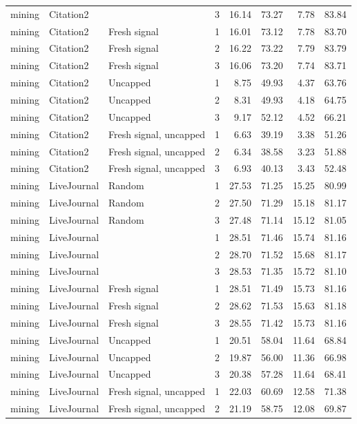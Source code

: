 \begin{table}[t]
\begin{tabular}{lllrrrrr}
mining & Citation2 & \ours{} & 3 & 16.14 & 73.27 & 7.78 & 83.84 \\
mining & Citation2 & Fresh signal & 1 & 16.01 & 73.12 & 7.78 & 83.70 \\
mining & Citation2 & Fresh signal & 2 & 16.22 & 73.22 & 7.79 & 83.79 \\
mining & Citation2 & Fresh signal & 3 & 16.06 & 73.20 & 7.74 & 83.71 \\
mining & Citation2 & Uncapped & 1 & 8.75 & 49.93 & 4.37 & 63.76 \\
mining & Citation2 & Uncapped & 2 & 8.31 & 49.93 & 4.18 & 64.75 \\
mining & Citation2 & Uncapped & 3 & 9.17 & 52.12 & 4.52 & 66.21 \\
mining & Citation2 & Fresh signal, uncapped & 1 & 6.63 & 39.19 & 3.38 & 51.26 \\
mining & Citation2 & Fresh signal, uncapped & 2 & 6.34 & 38.58 & 3.23 & 51.88 \\
mining & Citation2 & Fresh signal, uncapped & 3 & 6.93 & 40.13 & 3.43 & 52.48 \\
mining & LiveJournal & Random & 1 & 27.53 & 71.25 & 15.25 & 80.99 \\
mining & LiveJournal & Random & 2 & 27.50 & 71.29 & 15.18 & 81.17 \\
mining & LiveJournal & Random & 3 & 27.48 & 71.14 & 15.12 & 81.05 \\
mining & LiveJournal & \ours{} & 1 & 28.51 & 71.46 & 15.74 & 81.16 \\
mining & LiveJournal & \ours{} & 2 & 28.70 & 71.52 & 15.68 & 81.17 \\
mining & LiveJournal & \ours{} & 3 & 28.53 & 71.35 & 15.72 & 81.10 \\
mining & LiveJournal & Fresh signal & 1 & 28.51 & 71.49 & 15.73 & 81.16 \\
mining & LiveJournal & Fresh signal & 2 & 28.62 & 71.53 & 15.63 & 81.18 \\
mining & LiveJournal & Fresh signal & 3 & 28.55 & 71.42 & 15.73 & 81.16 \\
mining & LiveJournal & Uncapped & 1 & 20.51 & 58.04 & 11.64 & 68.84 \\
mining & LiveJournal & Uncapped & 2 & 19.87 & 56.00 & 11.36 & 66.98 \\
mining & LiveJournal & Uncapped & 3 & 20.38 & 57.28 & 11.64 & 68.41 \\
mining & LiveJournal & Fresh signal, uncapped & 1 & 22.03 & 60.69 & 12.58 & 71.38 \\
mining & LiveJournal & Fresh signal, uncapped & 2 & 21.19 & 58.75 & 12.08 & 69.87 \\

\end{tabular}
\end{table}
